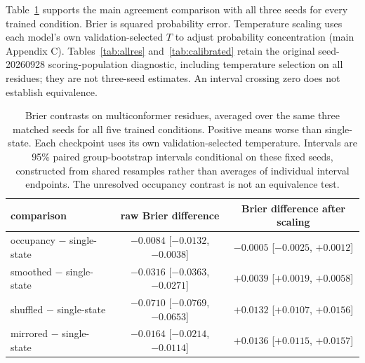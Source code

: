 \documentclass[10pt,a4paper]{article}
\begin{document}
Table~\ref{tab:calibrated3} supports the main agreement comparison with all three seeds for every trained condition. Brier is squared probability error. Temperature scaling uses each model's own validation-selected $T$ to adjust probability concentration (main Appendix C). Tables~\ref{tab:allres} and~\ref{tab:calibrated} retain the original seed-20260928 scoring-population diagnostic, including temperature selection on all residues; they are not three-seed estimates. An interval crossing zero does not establish equivalence.


\begin{table}[!htbp]
\centering
\caption{Brier contrasts on multiconformer residues, averaged over the same three matched seeds for all five trained conditions. Positive means worse than single-state. Each checkpoint uses its own validation-selected temperature. Intervals are 95\% paired group-bootstrap intervals conditional on these fixed seeds, constructed from shared resamples rather than averages of individual interval endpoints. The unresolved occupancy contrast is not an equivalence test.}
\label{tab:calibrated3}
\small\setlength{\tabcolsep}{5pt}
\begin{tabular}{@{}lcc@{}}
\toprule
comparison & raw Brier difference & Brier difference after scaling \\
\midrule
occupancy $-$ single-state & $-0.0084$ [$-0.0132$, $-0.0038$] & $-0.0005$ [$-0.0025$, $+0.0012$] \\
smoothed $-$ single-state & $-0.0316$ [$-0.0363$, $-0.0271$] & $+0.0039$ [$+0.0019$, $+0.0058$] \\
shuffled $-$ single-state & $-0.0710$ [$-0.0769$, $-0.0653$] & $+0.0132$ [$+0.0107$, $+0.0156$] \\
mirrored $-$ single-state & $-0.0164$ [$-0.0214$, $-0.0114$] & $+0.0136$ [$+0.0115$, $+0.0157$] \\
\bottomrule
\end{tabular}
\end{table}
\end{document}
